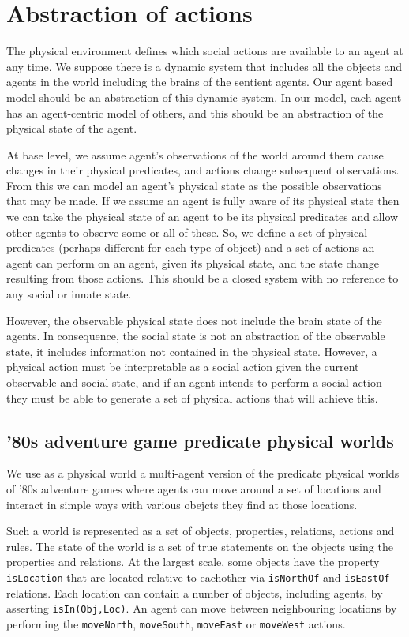 \documentclass[a4paper]{article}
\begin{document}
\section{Abstraction of actions}

The physical environment defines which social actions are available to an agent at any time. We suppose there is a dynamic system that includes all the objects and agents in the world including the brains of the sentient agents. Our agent based model should be an abstraction of this dynamic system. In our model, each agent has an agent-centric model of others, and this should be an abstraction of the physical state of the agent.

At base level, we assume agent's observations of the world around them cause changes in their physical predicates, and actions change subsequent observations. From this we can model an agent's physical state as the possible observations that may be made. If we assume an agent is fully aware of its physical state then we can take the physical state of an agent to be its physical predicates and allow other agents to observe some or all of these. So, we define a set of physical predicates (perhaps different for each type of object) and a set of actions an agent can perform on an agent, given its physical state, and the state change resulting from those actions. This should be a closed system with no reference to any social or innate state.

However, the observable physical state does not include the brain state of the agents. In consequence, the social state is not an abstraction of the observable state, it includes information not contained in the physical state. However, a physical action must be interpretable as a social action given the current observable and social state, and if an agent intends to perform a social action they must be able to generate a set of physical actions that will achieve this.

\subsection{'80s adventure game predicate physical worlds}

We use as a physical world a multi-agent version of the predicate physical worlds of '80s adventure games where agents can move around a set of locations and interact in simple ways with various obejcts they find at those locations.

Such a world is represented as a set of objects, properties, relations, actions and rules. The state of the world is a set of true statements on the objects using the properties and relations. At the largest scale, some objects have the property \texttt{isLocation} that are located relative to eachother via \texttt{isNorthOf} and \texttt{isEastOf} relations. Each location can contain a number of objects, including agents, by asserting \texttt{isIn(Obj,Loc)}. An agent can move between neighbouring locations by performing the \texttt{moveNorth}, \texttt{moveSouth}, \texttt{moveEast} or \texttt{moveWest} actions.
\end{document}
